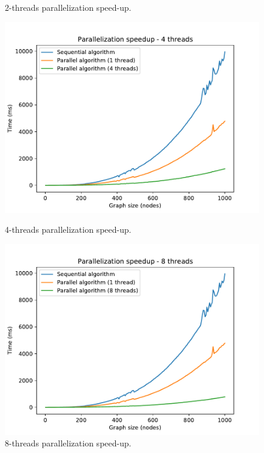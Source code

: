 \documentclass[11pt,a4paper]{article}
\begin{document}
\begin{figure}[H]
\begin{minipage}{.45\textwidth}
      \caption{2-threads parallelization speed-up.}
      \label{fig:comp_2thread}
   \end{minipage}%
   \label{fig:comprehensive_comp1}
\end{figure}
\vspace{-1.5em}
\begin{figure}[H]
   \centering
   \begin{minipage}{.45\textwidth}
      \centering
      \includegraphics[width=\linewidth]{comp_4thread.pdf}
      \caption{4-threads parallelization speed-up.}
      \label{fig:comp_4thread}
   \end{minipage}%
   \begin{minipage}{.45\textwidth}
      \centering
      \includegraphics[width=\linewidth]{comp_8thread.pdf}
      \caption{8-threads parallelization speed-up.}
      \label{fig:comp_8thread}
   \end{minipage}%
   \label{fig:comprehensive_comp2}
\end{figure}
\end{document}
